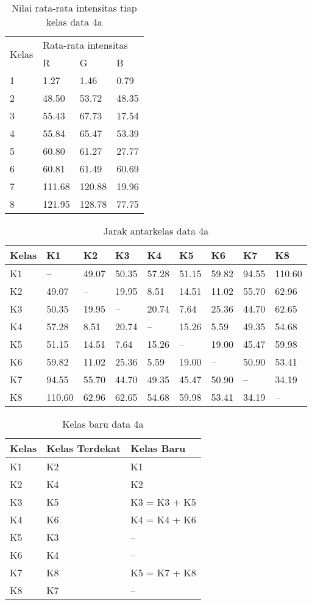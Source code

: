 \documentclass[laporan.tex]{subfiles}
\begin{document}
\begin{table}[h]
\centering
\begin{tabular}{|l|l|l|l|}
\cline{1-4}
\multirow{2}{*}{Kelas} & \multicolumn{3}{l|}{Rata-rata intensitas} \\
\cline{2-4}
 & R & G & B \\
\cline{1-4}
1 & 1.27 & 1.46 & 0.79 \\
2 & 48.50 & 53.72 & 48.35 \\
3 & 55.43 & 67.73 & 17.54 \\
4 & 55.84 & 65.47 & 53.39 \\
5 & 60.80 & 61.27 & 27.77 \\
6 & 60.81 & 61.49 & 60.69 \\
7 & 111.68 & 120.88 & 19.96 \\
8 & 121.95 & 128.78 & 77.75 \\
\cline{1-4}
\end{tabular}
\caption[]{Nilai rata-rata intensitas tiap kelas data 4a}
\label{table:avggreen1}
\end{table}

\begin{table}[h]
\centering
\begin{tabular}{|l|l|l|l|l|l|l|l|l|}
\hline
Kelas & K1 & K2 & K3 & K4 & K5 & K6 & K7 & K8 \\
\hline
K1 & -- & 49.07 & 50.35 & 57.28 & 51.15 & 59.82 & 94.55 & 110.60 \\
K2 & 49.07 & -- & 19.95 & 8.51 & 14.51 & 11.02 & 55.70 & 62.96 \\
K3 & 50.35 & 19.95 & -- & 20.74 & 7.64 & 25.36 & 44.70 & 62.65 \\
K4 & 57.28 & 8.51 & 20.74 & -- & 15.26 & 5.59 & 49.35 & 54.68 \\
K5 & 51.15 & 14.51 & 7.64 & 15.26 & -- & 19.00 & 45.47 & 59.98 \\
K6 & 59.82 & 11.02 & 25.36 & 5.59 & 19.00 & -- & 50.90 & 53.41 \\
K7 & 94.55 & 55.70 & 44.70 & 49.35 & 45.47 & 50.90 & -- & 34.19 \\
K8 & 110.60 & 62.96 & 62.65 & 54.68 & 59.98 & 53.41 & 34.19 & -- \\
\hline
\end{tabular}
\caption[]{Jarak antarkelas data 4a}
\label{table:distgreen}
\end{table}

\begin{table}[h]
\centering
\begin{tabular}{|l|l|l|}
\hline
Kelas & Kelas Terdekat & Kelas Baru \\
\hline
K1 & K2 & K1 \\
K2 & K4 & K2 \\
K3 & K5 & K3 = K3 + K5 \\
K4 & K6 & K4 = K4 + K6 \\
K5 & K3 & -- \\
K6 & K4 & -- \\
K7 & K8 & K5 = K7 + K8 \\
K8 & K7 & -- \\
\hline
\end{tabular}
\caption[]{Kelas baru data 4a}
\label{table:clsgreen2}
\end{table}
\end{document}
